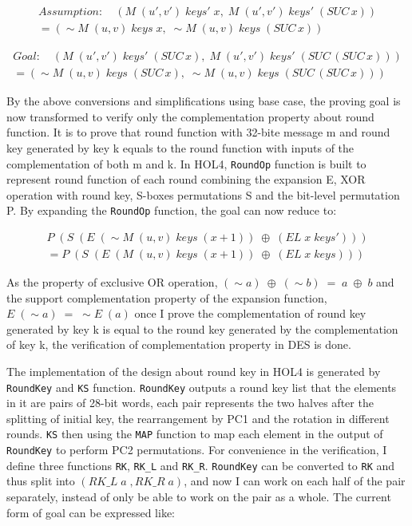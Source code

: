\documentclass{article}
\begin{document}
\begin{multline*}
Assumption: \quad (M \; (u', v') \; keys' \; x, \; M \; (u', v') \; keys' \; (SUC \, x)) \\
= (\sim M \; (u, v) \; keys \; x, \; \sim M \; (u, v) \; keys \; (SUC \, x))
\end{multline*}

\begin{multline*}
Goal: \quad (M \; (u', v') \; keys' \; (SUC \,x), \; M \; (u', v') \; keys' \; (SUC \,(SUC \, x))) \\
= (\sim M \; (u, v) \; keys \; (SUC \,x), \; \sim M \; (u, v) \; keys \; (SUC \,(SUC \, x)))
\end{multline*}

By the above conversions and simplifications using base case, the proving goal is now transformed to verify only the
complementation property about round function. It is to prove that round function with 32-bite message m and round
key generated by key k equals to the round function with inputs of
the complementation of both m and k. In HOL4, \verb|RoundOp| function is built to represent round function of each round
combining the expansion E, XOR operation with round key, S-boxes permutations S and the bit-level permutation P. By expanding
the \verb|RoundOp| function, the goal can now reduce to:

\begin{multline*}
P \; (S \; (E \;(\sim M \; (u, v) \; keys \; (x+1)) \; \oplus \; (EL \;x \;keys')))\\
= P \; (S \; (E \;(M \; (u, v) \; keys \; (x+1)) \;\oplus \;(EL \;x \;keys)))
\end{multline*}

As the property of exclusive OR operation, $(\sim a) \; \oplus \; (\sim  b) \;= \;a \; \oplus \; b$ and the support
complementation property of the expansion function, $E \; (\sim a) \;= \; \sim  E \; (a)$ once I prove the complementation of
round key generated by key k is equal to the round key generated by the complementation of key k, the verification of complementation property
in DES is done.

The implementation of the design about round key in HOL4 is generated by \verb|RoundKey| and \verb|KS| function. \verb|RoundKey| outputs a
round key list that the elements in it
are pairs of 28-bit words, each pair represents the two halves after the splitting of initial key, the rearrangement by PC1
and the rotation in different rounds. \verb|KS| then using the \verb|MAP| function to map each element in the output of \verb|RoundKey| to
perform PC2 permutations. For convenience in the verification, I define three functions \verb|RK|, \verb|RK_L| and \verb|RK_R|.
\verb|RoundKey| can be converted to \verb|RK| and thus split into $(RK\_L \; a \;,RK\_R \; a)$, and now I can work on each half of the pair
separately, instead of only be able to work on the pair as a whole. The current form of goal can be expressed like:
\end{document}
